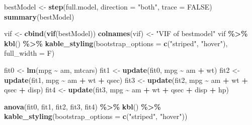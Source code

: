 \documentclass[
]{article}
\newenvironment{Shaded}{\begin{snugshade}}{\end{snugshade}}
\newcommand{\AttributeTok}[1]{\textcolor[rgb]{0.13,0.29,0.53}{#1}}
\newcommand{\ConstantTok}[1]{\textcolor[rgb]{0.56,0.35,0.01}{#1}}
\newcommand{\FunctionTok}[1]{\textcolor[rgb]{0.13,0.29,0.53}{\textbf{#1}}}
\newcommand{\NormalTok}[1]{#1}
\newcommand{\OtherTok}[1]{\textcolor[rgb]{0.56,0.35,0.01}{#1}}
\newcommand{\SpecialCharTok}[1]{\textcolor[rgb]{0.81,0.36,0.00}{\textbf{#1}}}
\newcommand{\StringTok}[1]{\textcolor[rgb]{0.31,0.60,0.02}{#1}}
\begin{document}
\begin{Shaded}
\begin{Highlighting}[]
\NormalTok{bestModel }\OtherTok{\textless{}{-}} \FunctionTok{step}\NormalTok{(full.model, }\AttributeTok{direction =} \StringTok{"both"}\NormalTok{,}
                  \AttributeTok{trace =} \ConstantTok{FALSE}\NormalTok{)}
\FunctionTok{summary}\NormalTok{(bestModel)}
\end{Highlighting}
\end{Shaded}

\begin{Shaded}
\begin{Highlighting}[]
\NormalTok{vif }\OtherTok{\textless{}{-}} \FunctionTok{cbind}\NormalTok{(}\FunctionTok{vif}\NormalTok{(bestModel))}
\FunctionTok{colnames}\NormalTok{(vif) }\OtherTok{\textless{}{-}} \StringTok{"VIF of bestmodel"}
\NormalTok{vif  }\SpecialCharTok{\%\textgreater{}\%}
  \FunctionTok{kbl}\NormalTok{() }\SpecialCharTok{\%\textgreater{}\%}
  \FunctionTok{kable\_styling}\NormalTok{(}\AttributeTok{bootstrap\_options =} \FunctionTok{c}\NormalTok{(}\StringTok{"striped"}\NormalTok{, }\StringTok{"hover"}\NormalTok{), }\AttributeTok{full\_width =}\NormalTok{ F)}
\end{Highlighting}
\end{Shaded}

\begin{Shaded}
\begin{Highlighting}[]
\NormalTok{fit0 }\OtherTok{\textless{}{-}} \FunctionTok{lm}\NormalTok{(mpg }\SpecialCharTok{\textasciitilde{}}\NormalTok{ am, mtcars)}
\NormalTok{fit1 }\OtherTok{\textless{}{-}} \FunctionTok{update}\NormalTok{(fit0, mpg }\SpecialCharTok{\textasciitilde{}}\NormalTok{ am }\SpecialCharTok{+}\NormalTok{ wt)}
\NormalTok{fit2 }\OtherTok{\textless{}{-}} \FunctionTok{update}\NormalTok{(fit1, mpg }\SpecialCharTok{\textasciitilde{}}\NormalTok{ am }\SpecialCharTok{+}\NormalTok{ wt }\SpecialCharTok{+}\NormalTok{ qsec)}
\NormalTok{fit3 }\OtherTok{\textless{}{-}} \FunctionTok{update}\NormalTok{(fit2, mpg }\SpecialCharTok{\textasciitilde{}}\NormalTok{ am }\SpecialCharTok{+}\NormalTok{ wt }\SpecialCharTok{+}\NormalTok{ qsec }\SpecialCharTok{+}\NormalTok{ disp)}
\NormalTok{fit4 }\OtherTok{\textless{}{-}} \FunctionTok{update}\NormalTok{(fit3, mpg }\SpecialCharTok{\textasciitilde{}}\NormalTok{ am }\SpecialCharTok{+}\NormalTok{ wt }\SpecialCharTok{+}\NormalTok{ qsec }\SpecialCharTok{+}\NormalTok{ disp }\SpecialCharTok{+}\NormalTok{ hp)}

\FunctionTok{anova}\NormalTok{(fit0, fit1, fit2, fit3, fit4)  }\SpecialCharTok{\%\textgreater{}\%}
  \FunctionTok{kbl}\NormalTok{() }\SpecialCharTok{\%\textgreater{}\%}
  \FunctionTok{kable\_styling}\NormalTok{(}\AttributeTok{bootstrap\_options =} \FunctionTok{c}\NormalTok{(}\StringTok{"striped"}\NormalTok{, }\StringTok{"hover"}\NormalTok{))}
\end{Highlighting}
\end{Shaded}
\end{document}
